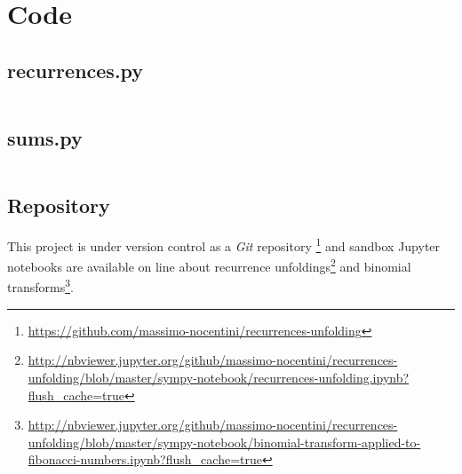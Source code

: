 
\chapter{Code}

\section{recurrences.py}
\begin{adjustwidth}{-4cm}{0cm}
    \inputminted{python}{../sympy-notebook/recurrences.py}
\end{adjustwidth}

\section{sums.py}

\begin{adjustwidth}{-4cm}{0cm}
    \inputminted{python}{../sympy-notebook/sums.py}
\end{adjustwidth}

\section{Repository}

This project is under version control as a \emph{Git} repository
\footnote{\url{https://github.com/massimo-nocentini/recurrences-unfolding}}
and sandbox Jupyter notebooks are available on line about recurrence
unfoldings\footnote{\url{http://nbviewer.jupyter.org/github/massimo-nocentini/recurrences-unfolding/blob/master/sympy-notebook/recurrences-unfolding.ipynb?flush_cache=true}} 
and binomial transforms\footnote{\url{http://nbviewer.jupyter.org/github/massimo-nocentini/recurrences-unfolding/blob/master/sympy-notebook/binomial-transform-applied-to-fibonacci-numbers.ipynb?flush_cache=true}}.

